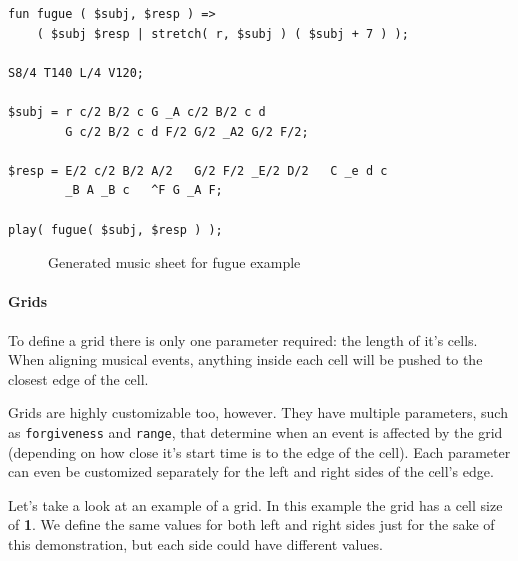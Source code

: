 \documentclass[a4paper,UKenglish,cleveref, autoref]{oasics-v2019}
\begin{document}
\begin{lstlisting}[caption={Example of repeating the same note},label=list:7,captionpos=t,abovecaptionskip=-\medskipamount]
fun fugue ( $subj, $resp ) => 
    ( $subj $resp | stretch( r, $subj ) ( $subj + 7 ) );

S8/4 T140 L/4 V120;

$subj = r c/2 B/2 c G _A c/2 B/2 c d
        G c/2 B/2 c d F/2 G/2 _A2 G/2 F/2;

$resp = E/2 c/2 B/2 A/2   G/2 F/2 _E/2 D/2   C _e d c
        _B A _B c   ^F G _A F;

play( fugue( $subj, $resp ) );
\end{lstlisting}


\begin{figure}[ht]
  \centering
  {%
  \setlength{\fboxsep}{0pt}%
  \setlength{\fboxrule}{0pt}%
  }%
  \caption{Generated music sheet for fugue example}
  \label{fig:fugue}
\end{figure}

\paragraph*{Grids}
To define a grid there is only one parameter required: the length of it's cells. When aligning musical events, anything inside each cell will be pushed to the closest edge of the cell.

Grids are highly customizable too, however. They have multiple parameters, such as \texttt{forgiveness} and \texttt{range}, that determine when an event is affected by the grid (depending on how close it's start time is to the edge of the cell). Each parameter can even be customized separately for the left and right sides of the cell's edge.

Let's take a look at an example of a grid. In this example the grid has a cell size of \textbf{1}. We define the same values for both left and right sides just for the sake of this demonstration, but each side could have different values.
\end{document}
